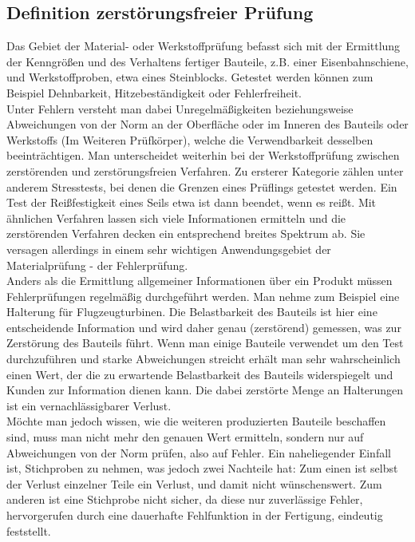 \documentclass[reducespace,stylepage,semiarbeit]{spezidoc}
\begin{document}
\subsection{Definition zerstörungsfreier Prüfung}
Das Gebiet der Material- oder Werkstoffprüfung befasst sich mit der Ermittlung der Kenngrößen und des Verhaltens fertiger Bauteile, z.B. 
einer Eisenbahnschiene, und Werkstoffproben, etwa eines Steinblocks. 
Getestet werden können zum Beispiel Dehnbarkeit, Hitzebeständigkeit oder Fehlerfreiheit.\\ 
Unter Fehlern versteht man dabei Unregelmäßigkeiten beziehungsweise Abweichungen von der Norm an der Oberfläche oder im Inneren des Bauteils oder Werkstoffs (Im Weiteren Prüfkörper), welche die Verwendbarkeit desselben beeinträchtigen. 
Man unterscheidet weiterhin bei der Werkstoffprüfung zwischen zerstörenden und zerstörungsfreien Verfahren. 
Zu ersterer Kategorie zählen unter anderem Stresstests, bei denen die Grenzen eines Prüflings getestet werden. 
Ein Test der Reißfestigkeit eines Seils etwa ist dann beendet, wenn es reißt. 
Mit ähnlichen Verfahren lassen sich viele Informationen ermitteln und die zerstörenden Verfahren decken ein entsprechend breites Spektrum ab. 
Sie versagen allerdings in einem sehr wichtigen Anwendungsgebiet der Materialprüfung - der Fehlerprüfung.\\
Anders als die Ermittlung allgemeiner Informationen über ein Produkt müssen Fehlerprüfungen regelmäßig durchgeführt werden. 
Man nehme zum Beispiel eine Halterung für Flugzeugturbinen. 
Die Belastbarkeit des Bauteils ist hier eine entscheidende Information und wird daher genau (zerstörend) gemessen, was zur Zerstörung des Bauteils führt. 
Wenn man einige Bauteile verwendet um den Test durchzuführen und starke Abweichungen streicht erhält man sehr wahrscheinlich einen Wert, der die zu erwartende Belastbarkeit des Bauteils widerspiegelt und Kunden zur Information dienen kann. 
Die dabei zerstörte Menge an Halterungen ist ein vernachlässigbarer Verlust.\\
Möchte man jedoch wissen, wie die weiteren produzierten Bauteile beschaffen sind, muss man nicht mehr den genauen Wert ermitteln, sondern nur auf Abweichungen von der Norm prüfen, also auf Fehler. 
Ein naheliegender Einfall ist, Stichproben zu nehmen, was jedoch zwei Nachteile hat: Zum einen ist selbst der Verlust einzelner Teile ein Verlust, und damit nicht wünschenswert. 
Zum anderen ist eine Stichprobe nicht sicher, da diese nur zuverlässige Fehler, hervorgerufen durch eine dauerhafte Fehlfunktion in der Fertigung, eindeutig feststellt.\\
\end{document}
